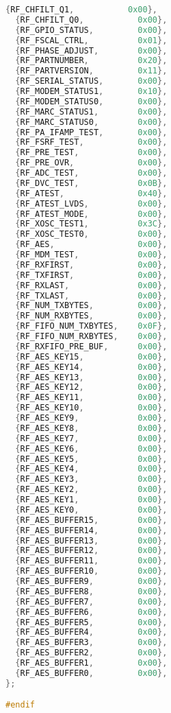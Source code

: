 \begin{lstlisting}[language=C,frame=b,captionpos=b,caption={Struktur mit Adresse-Wert Paaren für die Registerkonfiguration des CC1200 Funkchips},label=lst:cc1200register]
  {RF_CHFILT_Q1,           0x00},
  {RF_CHFILT_Q0,           0x00},
  {RF_GPIO_STATUS,         0x00},
  {RF_FSCAL_CTRL,          0x01},
  {RF_PHASE_ADJUST,        0x00},
  {RF_PARTNUMBER,          0x20},
  {RF_PARTVERSION,         0x11},
  {RF_SERIAL_STATUS,       0x00},
  {RF_MODEM_STATUS1,       0x10},
  {RF_MODEM_STATUS0,       0x00},
  {RF_MARC_STATUS1,        0x00},
  {RF_MARC_STATUS0,        0x00},
  {RF_PA_IFAMP_TEST,       0x00},
  {RF_FSRF_TEST,           0x00},
  {RF_PRE_TEST,            0x00},
  {RF_PRE_OVR,             0x00},
  {RF_ADC_TEST,            0x00},
  {RF_DVC_TEST,            0x0B},
  {RF_ATEST,               0x40},
  {RF_ATEST_LVDS,          0x00},
  {RF_ATEST_MODE,          0x00},
  {RF_XOSC_TEST1,          0x3C},
  {RF_XOSC_TEST0,          0x00},
  {RF_AES,                 0x00},
  {RF_MDM_TEST,            0x00},
  {RF_RXFIRST,             0x00},
  {RF_TXFIRST,             0x00},
  {RF_RXLAST,              0x00},
  {RF_TXLAST,              0x00},
  {RF_NUM_TXBYTES,         0x00},
  {RF_NUM_RXBYTES,         0x00},
  {RF_FIFO_NUM_TXBYTES,    0x0F},
  {RF_FIFO_NUM_RXBYTES,    0x00},
  {RF_RXFIFO_PRE_BUF,      0x00},
  {RF_AES_KEY15,           0x00},
  {RF_AES_KEY14,           0x00},
  {RF_AES_KEY13,           0x00},
  {RF_AES_KEY12,           0x00},
  {RF_AES_KEY11,           0x00},
  {RF_AES_KEY10,           0x00},
  {RF_AES_KEY9,            0x00},
  {RF_AES_KEY8,            0x00},
  {RF_AES_KEY7,            0x00},
  {RF_AES_KEY6,            0x00},
  {RF_AES_KEY5,            0x00},
  {RF_AES_KEY4,            0x00},
  {RF_AES_KEY3,            0x00},
  {RF_AES_KEY2,            0x00},
  {RF_AES_KEY1,            0x00},
  {RF_AES_KEY0,            0x00},
  {RF_AES_BUFFER15,        0x00},
  {RF_AES_BUFFER14,        0x00},
  {RF_AES_BUFFER13,        0x00},
  {RF_AES_BUFFER12,        0x00},
  {RF_AES_BUFFER11,        0x00},
  {RF_AES_BUFFER10,        0x00},
  {RF_AES_BUFFER9,         0x00},
  {RF_AES_BUFFER8,         0x00},
  {RF_AES_BUFFER7,         0x00},
  {RF_AES_BUFFER6,         0x00},
  {RF_AES_BUFFER5,         0x00},
  {RF_AES_BUFFER4,         0x00},
  {RF_AES_BUFFER3,         0x00},
  {RF_AES_BUFFER2,         0x00},
  {RF_AES_BUFFER1,         0x00},
  {RF_AES_BUFFER0,         0x00},
};

#endif
\end{lstlisting}
